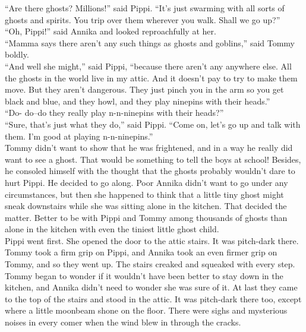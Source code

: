 \documentclass{standard}
\begin{document}
“Are there ghosts? Millions!” said Pippi. “It’s just swarming with all sorts of ghosts and spirits. You trip over them wherever you walk. Shall we go up?”\\

“Oh, Pippi!” said Annika and looked reproachfully at her.\\

“Mamma says there aren’t any such things as ghosts and goblins,” said Tommy boldly.\\

“And well she might,” said Pippi, “because there aren’t any anywhere else. All the ghosts in the world live in my attic. And it doesn’t pay to try to make them move. But they aren’t dangerous. They just pinch you in the arm so you get black and blue, and they howl, and they play ninepins with their heads.”\\

“Do- do--do they really play n-n-ninepins with their heads?”\\

“Sure, that’s just what they do,” said Pippi. “Come on, let’s go up and talk with them. I’m good at playing n-n-ninepins.”\\

Tommy didn’t want to show that he was frightened, and in a way he really did want to see a ghost. That would be something to tell the boys at school! Besides, he consoled himself with the thought that the ghosts probably wouldn’t dare to hurt Pippi. He decided to go along. Poor Annika didn’t want to go under any circumstances, but then she happened to think that a little tiny ghost might sneak downstairs while she was sitting alone in the kitchen. That decided the matter. Better to be with Pippi and Tommy among thousands of ghosts than alone in the kitchen with even the tiniest little ghost child.\\

Pippi went first. She opened the door to the attic stairs. It was pitch-dark there. Tommy took a firm grip on Pippi, and Annika took an even firmer grip on Tommy, and so they went up. The stairs creaked and squeaked with every step. Tommy began to wonder if it wouldn’t have been better to stay down in the kitchen, and Annika didn’t need to wonder she was sure of it. At last they came to the top of the stairs and stood in the attic. It was pitch-dark there too, except where a little moonbeam shone on the floor. There were sighs and mysterious noises in every comer when the wind blew in through the cracks.\\
\end{document}
